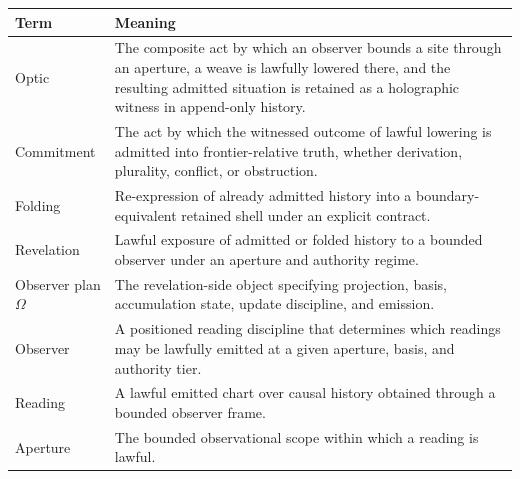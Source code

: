 \documentclass{aion}
\begin{document}
\begin{center}
	\AIONTableStyleOn
	\begin{tabularx}{\textwidth}{@{}>{\raggedright\arraybackslash}p{}X@{}}
		\toprule
		\AIONTableHead
		Term                                   & Meaning                                                                                                                                                                                                        \\
		\midrule
		Optic                                  & The composite act by which an observer bounds a site through an aperture, a weave is lawfully lowered there, and the resulting admitted situation is retained as a holographic witness in append-only history. \\
		Commitment                             & The act by which the witnessed outcome of lawful lowering is admitted into frontier-relative truth, whether derivation, plurality, conflict, or obstruction.                                                   \\
		Folding                                & Re-expression of already admitted history into a boundary-equivalent retained shell under an explicit contract.                                                                                                \\
			Revelation                             & Lawful exposure of admitted or folded history to a bounded observer under an aperture and authority regime.                                                                                                    \\
			Observer plan \(\Omega\)               & The revelation-side object specifying projection, basis, accumulation state, update discipline, and emission.                                                                                                  \\
			Observer                               & A positioned reading discipline that determines which readings may be lawfully emitted at a given aperture, basis, and authority tier.                                                                         \\
			Reading                                & A lawful emitted chart over causal history obtained through a bounded observer frame.                                                                                                                          \\
			Aperture                               & The bounded observational scope within which a reading is lawful.                                                                                                                                              \\

\end{tabularx}
\end{center}
\end{document}
